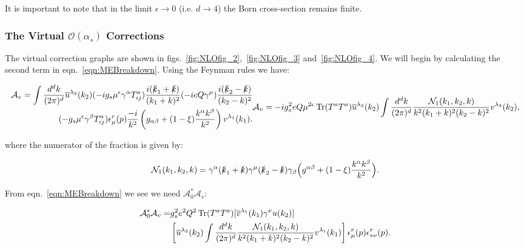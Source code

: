 			It is important to note that in the limit $\epsilon\to0$ (i.e. $d\to4$) the Born cross-section remains finite.

		\subsubsection{The Virtual $\mathcal{O}(\alpha_s)$ Corrections}

			The virtual correction graphs are shown in figs.~\eqref{fig:NLOfig_2},~\eqref{fig:NLOfig_3} and~\eqref{fig:NLOfig_4}.  We will begin by calculating
			the second term in eqn.~\eqref{eqn:MEBreakdown}.  Using the Feynman rules we have:

			\small
				\begin{subequations}
				\begin{align*}
					\mathcal{A}_v = \int\frac{d^{d}k}{(2\pi)^{d}} \overline{u}^{\lambda_2}(k_2)
					(-ig_s\mu^\epsilon\gamma^\alpha T^a_{ij})\frac{i(\slashed k_1 + \slashed k)}{(k_1+k)^2}
					(-ieQ\gamma^\mu)\frac{i(\slashed k_2 - \slashed k)}{(k_2 - k)^2}\\
					(-g_s\mu^\epsilon\gamma^\beta T^a_{ij})
					\epsilon^r_\mu(p)\frac{-i}{k^2}\left(g_{\alpha\beta} +
					(1-\xi)\frac{k^\alpha k^\beta}{k^2}\right)v^{\lambda_1}(k_1).
				\end{align*}
				\begin{align*}
					\mathcal{A}_v = -ig_s^2eQ\mu^{2\epsilon}\Tr(T^aT^a)\overline{u}^{\lambda_2}
					(k_2)\int\frac{d^{d}k}{(2\pi)^{d}}\frac{\mathcal{N}_1(k_1, k_2, k)}{k^2(k_1+k)^2(k_2-k)^2}v^{\lambda_2}(k_2),
				\end{align*}
				\end{subequations}
			\normalsize

			where the numerator of the fraction is given by:

			\begin{equation}
				\mathcal{N}_1(k_1, k_2, k) = \gamma^\alpha(\slashed k_1 + \slashed k)\gamma^\mu(\slashed k_2 -
				\slashed k)\gamma_\beta\Big(g^{\alpha\beta} + (1-\xi)\frac{k^\alpha k^\beta}{k^2}\Big).
			\end{equation}

			From eqn.~\eqref{eqn:MEBreakdown} we see we need $\mathcal{A}_0^*\mathcal{A}_v$:

			\begin{align}
				\mathcal{A}_0^*\mathcal{A}_v = &g_s^2e^2Q^2\operatorname{Tr}(T^aT^a)[\overline{v}^{\lambda_1}(k_1)\gamma^\nu u(k_2)]\\
				&\left[\overline{u}^{\lambda_2}(k_2)\int\frac{d^{d}k}{(2\pi)^{d}}\frac{\mathcal{N}_1(k_1, k_2, k)}
				{k^2(k_1+k)^2(k_2-k)^2}v^{\lambda_1}(k_1)\right]\epsilon^r_{\mu}(p)\epsilon^r_{*\nu}(p).
			\end{align}

